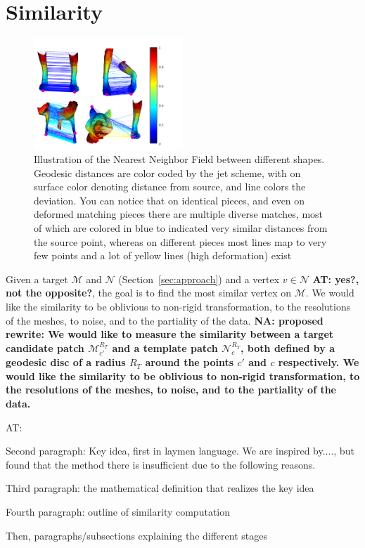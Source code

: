 \documentclass[10pt,twocolumn,letterpaper]{article}
\newcommand{\colornote}[3]{{\color{#1}\bf{#2: #3}\normalfont}}
\newcommand{\colornote}[3]{}
\newcommand {\ayellet}[1]{\colornote{blue}{AT}{#1}}
\newcommand {\nadav}[1]{\colornote{red}{NA}{#1}}
\begin{document}
\section{Similarity}
\label{sec:similarity}
\begin{figure}[htb]
	
	\includegraphics[width=0.5\textwidth]{figures/DDIS2.png}
	\caption{Illustration of the Nearest Neighbor Field between different shapes. 
		Geodesic distances are color coded by the jet scheme, with on surface color denoting distance from source, and line colors the deviation. 
		You can notice that on identical pieces, and even on deformed matching pieces there are multiple diverse matches, most of which are colored in blue to indicated very similar distances from the source point, whereas on different pieces most lines map to very few points and a lot of yellow lines (high deformation) exist}
\end{figure}

Given a target $\mathcal{M}$  and $\mathcal{N}$ (Section~\ref{sec:approach}) and a vertex $v \in  \mathcal{N}$ \ayellet{yes?, not the opposite?}, the goal is to find the most similar vertex on $\mathcal{M}$.
We would like the similarity to be oblivious to non-rigid transformation, to the resolutions of the meshes, to noise, and to the partiality of the data.
 \nadav{proposed rewrite: We would like to measure the similarity between a target candidate patch ${\mathcal{M}^{R_T}_{c'}}$ and a template patch ${\mathcal{N}^{R_T}_{c}}$, both defined by a geodesic disc of a radius $R_T$ around the points $c'$ and $c$ respectively. We would like the similarity to be oblivious to non-rigid transformation, to the resolutions of the meshes, to noise, and to the partiality of the data.}
\ayellet{

Second paragraph: Key idea, first in laymen language.
We are inspired by...., but found that the method there is insufficient due to the following reasons.

Third paragraph: the mathematical definition that realizes the key idea

Fourth paragraph: outline of similarity computation

Then, paragraphs/subsections explaining the different stages
}
\end{document}
